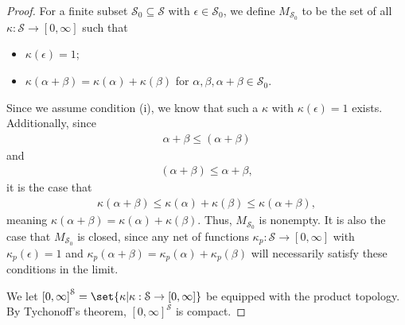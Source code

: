 \documentclass[10pt]{mypackage2}
\begin{document}
\begin{proof}
  For a finite subset $\mathcal{S}_0 \subseteq \mathcal{S}$ with $\epsilon\in \mathcal{S}_0$, we define $M_{\mathcal{S}_0}$ to be the set of all $\kappa\colon \mathcal{S}\rightarrow [0,\infty]$ such that
  \begin{itemize}
    \item $\kappa\left(\epsilon\right) = 1$;
    \item $\kappa\left(\alpha + \beta\right) = \kappa\left(\alpha\right) + \kappa\left(\beta\right)$ for $\alpha,\beta,\alpha + \beta\in \mathcal{S}_0$.
  \end{itemize}
  Since we assume condition (i), we know that such a $\kappa$ with $\kappa\left(\epsilon\right) = 1$ exists. Additionally, since
  \begin{align*}
    \alpha + \beta \leq \left(\alpha + \beta\right)
  \end{align*}
  and
  \begin{align*}
    \left(\alpha + \beta\right) \leq \alpha + \beta,
  \end{align*}
  it is the case that
  \begin{align*}
    \kappa\left(\alpha + \beta\right) \leq \kappa\left(\alpha\right) + \kappa\left(\beta\right) \leq \kappa\left(\alpha + \beta\right),
  \end{align*}
  meaning $\kappa\left(\alpha + \beta\right) = \kappa\left(\alpha\right) + \kappa\left(\beta\right)$. Thus, $M_{\mathcal{S}_0}$ is nonempty. It is also the case that $M_{\mathcal{S}_0}$ is closed, since any net of functions $\kappa_{p}\colon \mathcal{S}\rightarrow [0,\infty]$ with $\kappa_{p}\left(\epsilon\right) = 1$ and $\kappa_{p}\left(\alpha + \beta\right) = \kappa_{p}\left(\alpha\right) + \kappa_{p}\left(\beta\right)$ will necessarily satisfy these conditions in the limit.\newline

  We let $\left[0,\infty\right]^{\mathcal{S}} = \set{\kappa| \kappa:\mathcal{S}\rightarrow [0,\infty]}$ be equipped with the product topology. By Tychonoff's theorem, $\left[0,\infty\right]^{\mathcal{S}}$ is compact.\newline


\end{proof}
\end{document}
